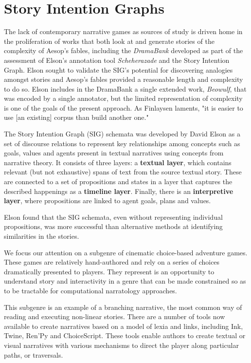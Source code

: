 \section{Story Intention Graphs}
\label{sec:orgheadline4}
The lack of contemporary narrative games as sources of study is driven
home in the proliferation of works that both look at and generate
stories of the complexity of Aesop's fables, including the \emph{DramaBank}
developed as part of the assessment of Elson's annotation tool
\emph{Scheherazade} and the Story Intention Graph. Elson sought to validate
the SIG's potential for discovering analogies amongst stories and
Aesop's fables provided a reasonable length and complexity to do
so. Elson includes in the DramaBank a single extended work, \emph{Beowulf},
that was encoded by a single annotator, but the limited representation
of complexity is one of the goals of the present approach. As
Finlaysen laments, "it is easier to use [an existing] corpus than
build another one."  \cite{Finlayson2013}

The Story Intention Graph (SIG) schemata was developed by David Elson
as a set of discourse relations to represent key relationships among
concepts such as goals, values and agents present in textual
narratives using concepts from narrative theory. It consists of three
layers: a \textbf{textual layer}, which contains relevant (but not
exhaustive) spans of text from the source textual story. These are
connected to a set of propositions and states in a layer that captures
the described happenings as a \textbf{timeline layer}. Finally, there is an
\textbf{interpretive layer}, where propositions are linked to agent goals,
plans and values. 

Elson found that the SIG schemata, even without representing
individual propositions, was more successful than alternative methods
at identifying similarities in the stories.

We focus our attention on a subgenre of cinematic choice-based
adventure games. These games are relatively hand-authored and rely on
a series of choices dramatically presented to players. They represent
is an opportunity to understand story and interactivity in a genre
that can be made constrained so as to be tractable for computational
narratology approaches.

This subgenre is an example of a branching narrative, the most common
way of reading and executing non-linear stories. There are a number of
tools now available to create narratives based on a model of lexia and
links, including Ink, Twine, Ren'Py and ChoiceScript. These tools
enable authors to create textual or visual narratives with various
mechanisms to direct the player along particular paths, or traversals.
